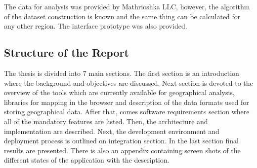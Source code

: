 The data for analysis was provided by Mathrioshka LLC, however, the algorithm of the dataset
construction is known and the same thing can be calculated for any other region. The interface
prototype was also provided.

\subsection{Structure of the Report}

The thesis is divided into 7 main sections. The first section is an introduction where the
background and objectives are discussed. Next section is devoted to the overview of the tools which
are currently available for geographical analysis, libraries for mapping in the browser and
description of the data formats used for storing geographical data. After that, comes software
requirements section where all of the mandatory features are listed. Then, the architecture and
implementation are described. Next, the development environment and deployment process is outlined on
integration section. In the last section final results are presented. There is also an appendix
containing screen shots of the different states of the application with the description.
